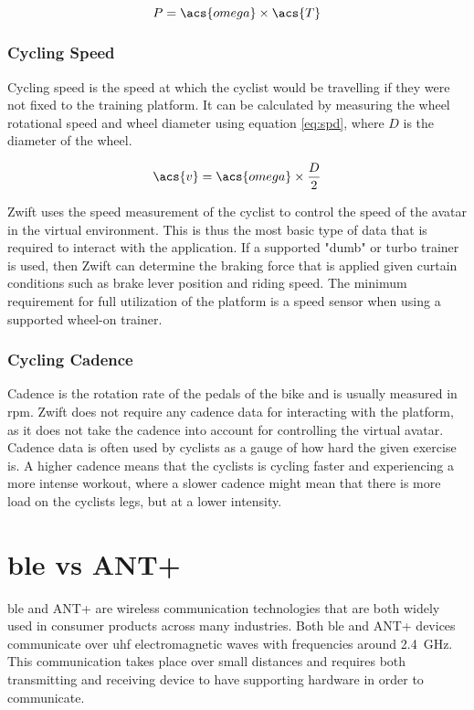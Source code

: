 \begin{equation}
	P = \acs{omega} \times \acs{T}
	\label{eq:pow}
\end{equation}

\subsubsection{Cycling Speed}
Cycling speed is the speed at which the cyclist would be travelling if they were not fixed to the training platform. It can be calculated by measuring the wheel rotational speed and wheel diameter using equation \ref{eq:spd}, where $D$ is the diameter of the wheel.

\begin{equation}
	\acs{v} = \acs{omega} \times \frac{D}{2}
	\label{eq:spd}
\end{equation}

Zwift uses the speed measurement of the cyclist to control the speed of the avatar in the virtual environment. This is thus the most basic type of data that is required to interact with the application. If a supported "dumb" or turbo trainer is used, then Zwift can determine the braking force that is applied given curtain conditions such as brake lever position and riding speed.
The minimum requirement for full utilization of the platform is a speed sensor when using a supported wheel-on trainer.

\subsubsection{Cycling Cadence}
Cadence is the rotation rate of the pedals of the bike and is usually measured in \ac{rpm}. Zwift does not require any cadence data for interacting with the platform, as it does not take the cadence into account for controlling the virtual avatar. Cadence data is often used by cyclists as a gauge of how hard the given exercise is. A higher cadence means that the cyclists is cycling faster and experiencing a more intense workout, where a slower cadence might mean that there is more load on the cyclists legs, but at a lower intensity.

\section{\ac{ble} vs ANT+}
\label{sec:ant}

\ac{ble} and ANT+ are wireless communication technologies that are both widely used in consumer products across many industries. Both \ac{ble} and ANT+ devices communicate over \ac{uhf} electromagnetic waves with frequencies around \SI{2.4}{\giga\hertz}. This communication takes place over small distances and requires both transmitting and receiving device to have supporting hardware in order to communicate.


